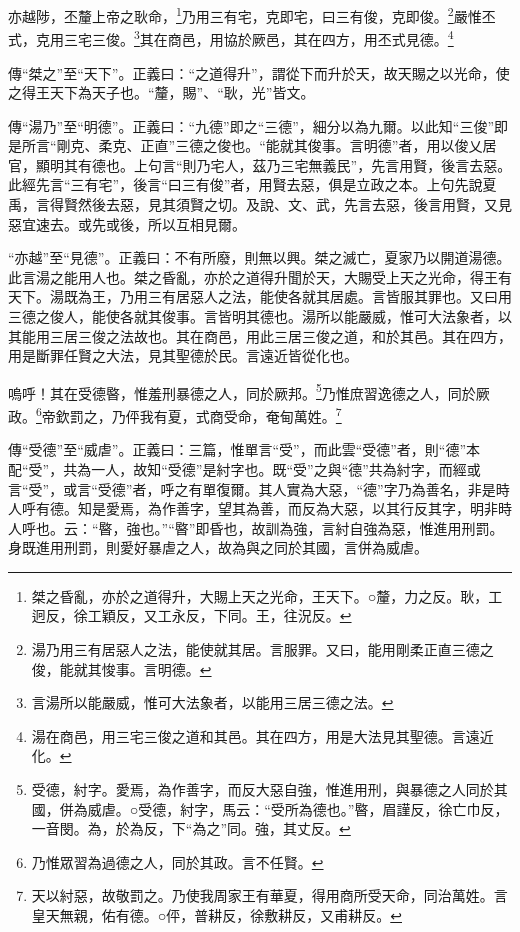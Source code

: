 亦越陟，丕釐上帝之耿命，\footnote{桀之昏亂，亦於之道得升，大賜上天之光命，王天下。○釐，力之反。耿，工迥反，徐工穎反，又工永反，下同。王，往況反。}乃用三有宅，克即宅，曰三有俊，克即俊。\footnote{湯乃用三有居惡人之法，能使就其居。言服罪。又曰，能用剛柔正直三德之俊，能就其悛事。言明德。}嚴惟丕式，克用三宅三俊。\footnote{言湯所以能嚴威，惟可大法象者，以能用三居三德之法。}其在商邑，用協於厥邑，其在四方，用丕式見德。\footnote{湯在商邑，用三宅三俊之道和其邑。其在四方，用是大法見其聖德。言遠近化。}


{\noindent\zhuan{}\fzbyks 傳“桀之”至“天下”。正義曰：“之道得升”，謂從下而升於天，故天賜之以光命，使之得王天下為天子也。“釐，賜”、“耿，光”皆文。 \par}

{\noindent\zhuan{}\fzbyks 傳“湯乃”至“明德”。正義曰：“九德”即之“三德”，細分以為九爾。以此知“三俊”即是所言“剛克、柔克、正直”三德之俊也。“能就其俊事。言明德”者，用以俊乂居官，顯明其有德也。上句言“則乃宅人，茲乃三宅無義民”，先言用賢，後言去惡。此經先言“三有宅”，後言“曰三有俊”者，用賢去惡，俱是立政之本。上句先說夏禹，言得賢然後去惡，見其須賢之切。及說、文、武，先言去惡，後言用賢，又見惡宜速去。或先或後，所以互相見爾。 \par}

{\noindent\shu{}\fzkt “亦越”至“見德”。正義曰：不有所廢，則無以興。桀之滅亡，夏家乃以開道湯德。此言湯之能用人也。桀之昏亂，亦於之道得升聞於天，大賜受上天之光命，得王有天下。湯既為王，乃用三有居惡人之法，能使各就其居處。言皆服其罪也。又曰用三德之俊人，能使各就其俊事。言皆明其德也。湯所以能嚴威，惟可大法象者，以其能用三居三俊之法故也。其在商邑，用此三居三俊之道，和於其邑。其在四方，用是斷罪任賢之大法，見其聖德於民。言遠近皆從化也。 \par}

嗚呼！其在受德暋，惟羞刑暴德之人，同於厥邦。\footnote{受德，紂字。愛焉，為作善字，而反大惡自強，惟進用刑，與暴德之人同於其國，併為威虐。○受德，紂字，馬云：“受所為德也。”暋，眉謹反，徐亡巾反，一音閔。為，於為反，下“為之”同。強，其丈反。}乃惟庶習逸德之人，同於厥政。\footnote{乃惟眾習為過德之人，同於其政。言不任賢。}帝欽罰之，乃伻我有夏，式商受命，奄甸萬姓。\footnote{天以紂惡，故敬罰之。乃使我周家王有華夏，得用商所受天命，同治萬姓。言皇天無親，佑有德。○伻，普耕反，徐敷耕反，又甫耕反。}


{\noindent\zhuan{}\fzbyks 傳“受德”至“威虐”。正義曰：三篇，惟單言“受”，而此雲“受德”者，則“德”本配“受”，共為一人，故知“受德”是紂字也。既“受”之與“德”共為紂字，而經或言“受”，或言“受德”者，呼之有單復爾。其人實為大惡，“德”字乃為善名，非是時人呼有德。知是愛焉，為作善字，望其為善，而反為大惡，以其行反其字，明非時人呼也。云：“暋，強也。”“暋”即昏也，故訓為強，言紂自強為惡，惟進用刑罰。身既進用刑罰，則愛好暴虐之人，故為與之同於其國，言併為威虐。 \par}

